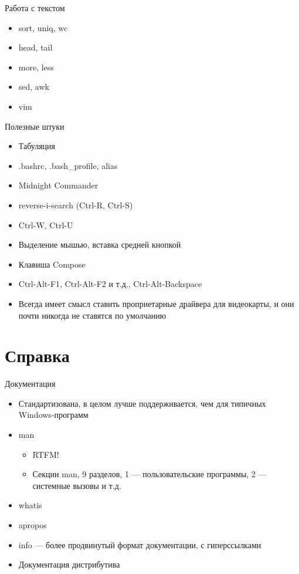 \documentclass{../../slides-style}
\begin{document}
    \begin{frame}{Работа с текстом}
        \begin{itemize}
            \item sort, uniq, wc
            \item head, tail
            \item more, less
            \item sed, awk
            \item vim
        \end{itemize}
    \end{frame}

    \begin{frame}{Полезные штуки}
        \begin{itemize}
            \item Табуляция
            \item .bashrc, .bash\_profile, alias
            \item Midnight Commander
            \item reverse-i-search (Ctrl-R, Ctrl-S)
            \item Ctrl-W, Ctrl-U
            \item Выделение мышью, вставка средней кнопкой
            \item Клавиша Compose
            \item Ctrl-Alt-F1, Ctrl-Alt-F2 и т.д., Ctrl-Alt-Backspace
            \item Всегда имеет смысл ставить проприетарные драйвера для видеокарты, и они почти никогда не ставятся по умолчанию
        \end{itemize}
    \end{frame}

    \section{Справка}

    \begin{frame}{Документация}
        \begin{itemize}
            \item Стандартизована, в целом лучше поддерживается, чем для типичных Windows-программ
            \item man
            \begin{itemize}
                \item RTFM!
                \item Секции man, 9 разделов, 1 --- пользовательские программы, 2 --- системные вызовы и т.д.
            \end{itemize}
            \item whatis
            \item apropos
            \item info --- более продвинутый формат документации, с гиперссылками
            \item Документация дистрибутива
        \end{itemize}
    \end{frame}
\end{document}

